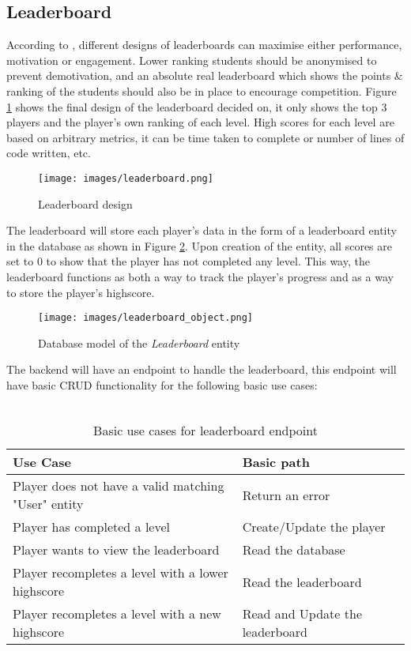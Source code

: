 \subsection{Leaderboard}
According to \cite{https://doi.org/10.1111/jcal.13077}, different designs of leaderboards can maximise either performance, motivation or engagement. Lower ranking students should be anonymised to prevent demotivation, and an absolute real leaderboard which shows the points \& ranking of the students should also be in place to encourage competition. Figure \ref{fig:leaderboard} shows the final design of the leaderboard decided on, it only shows the top 3 players and the player's own ranking of each level. High scores for each level are based on arbitrary metrics, it can be time taken to complete or number of lines of code written, etc.
\begin{figure}[H]
    \centering
    \texttt{[image: images/leaderboard.png]}
    \caption{Leaderboard design}    
    \label{fig:leaderboard}
\end{figure}

The leaderboard will store each player's data in the form of a leaderboard entity in the database as shown in Figure \ref{fig:leaderboard_object}. Upon creation of the entity, all scores are set to 0 to show that the player has not completed any level. This way, the leaderboard functions as both a way to track the player's progress and as a way to store the player's highscore.
\begin{center} 
    \begin{figure}[H]
        \centering
        \texttt{[image: images/leaderboard\_object.png]}
        \caption{Database model of the \textit{Leaderboard} entity}    
        \label{fig:leaderboard_object}
    \end{figure}
\end{center}
The backend will have an endpoint to handle the leaderboard, this endpoint will have basic CRUD functionality for the following basic use cases:
\\\\
\begin{table}[H]
    \caption{Basic use cases for leaderboard endpoint}
    \begin{tabular}{|p{11cm}|p{5cm}|}
        \hline
        Use Case & Basic path\\
        \hline
        Player does not have a valid matching "User" entity & Return an error\\
        \hline
        Player has completed a level & Create/Update the player\\
        \hline
        Player wants to view the leaderboard & Read the database\\
        \hline
        Player recompletes a level with a lower highscore & Read the leaderboard \\
        \hline
        Player recompletes a level with a new highscore & Read and Update the leaderboard\\
        \hline
    \end{tabular}
\end{table}

